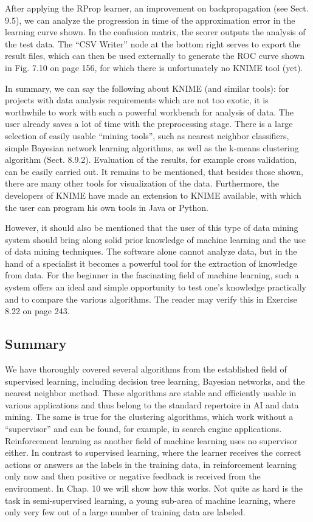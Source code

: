 \documentclass[10pt]{book}
\begin{document}
After applying the RProp learner, an improvement on backpropagation (see Sect. 9.5), we can analyze the progression in time of the approximation error in the learning curve shown. In the confusion matrix, the scorer outputs the analysis of the test data. The ``CSV Writer'' node at the bottom right serves to export the result files, which can then be used externally to generate the ROC curve shown in Fig. 7.10 on page 156, for which there is unfortunately no KNIME tool (yet).

In summary, we can say the following about KNIME (and similar tools): for projects with data analysis requirements which are not too exotic, it is worthwhile to work with such a powerful workbench for analysis of data. The user already saves a lot of time with the preprocessing stage. There is a large selection of easily usable ``mining tools'', such as nearest neighbor classifiers, simple Bayesian network learning algorithms, as well as the k-means clustering algorithm (Sect. 8.9.2). Evaluation of the results, for example cross validation, can be easily carried out. It remains to be mentioned, that besides those shown, there are many other tools for visualization of the data. Furthermore, the developers of KNIME have made an extension to KNIME available, with which the user can program his own tools in Java or Python.

However, it should also be mentioned that the user of this type of data mining system should bring along solid prior knowledge of machine learning and the use of data mining techniques. The software alone cannot analyze data, but in the hand of a specialist it becomes a powerful tool for the extraction of knowledge from data. For the beginner in the fascinating field of machine learning, such a system offers an ideal and simple opportunity to test one's knowledge practically and to compare the various algorithms. The reader may verify this in Exercise 8.22 on page 243.

\subsection{Summary}
We have thoroughly covered several algorithms from the established field of supervised learning, including decision tree learning, Bayesian networks, and the nearest neighbor method. These algorithms are stable and efficiently usable in various applications and thus belong to the standard repertoire in AI and data mining. The same is true for the clustering algorithms, which work without a ``supervisor'' and can be found, for example, in search engine applications. Reinforcement learning as another field of machine learning uses no supervisor either. In contrast to supervised learning, where the learner receives the correct actions or answers as the labels in the training data, in reinforcement learning only now and then positive or negative feedback is received from the environment. In Chap. 10 we will show how this works. Not quite as hard is the task in semi-supervised learning, a young sub-area of machine learning, where only very few out of a large number of training data are labeled.
\end{document}

